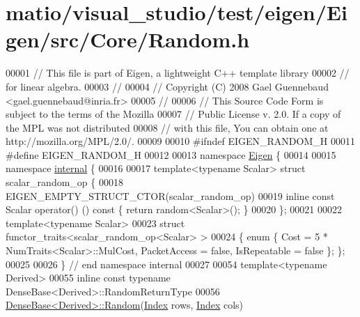 \hypertarget{matio_2visual__studio_2test_2eigen_2_eigen_2src_2_core_2_random_8h_source}{}\section{matio/visual\+\_\+studio/test/eigen/\+Eigen/src/\+Core/\+Random.h}
\label{matio_2visual__studio_2test_2eigen_2_eigen_2src_2_core_2_random_8h_source}

\begin{DoxyCode}
00001 \textcolor{comment}{// This file is part of Eigen, a lightweight C++ template library}
00002 \textcolor{comment}{// for linear algebra.}
00003 \textcolor{comment}{//}
00004 \textcolor{comment}{// Copyright (C) 2008 Gael Guennebaud <gael.guennebaud@inria.fr>}
00005 \textcolor{comment}{//}
00006 \textcolor{comment}{// This Source Code Form is subject to the terms of the Mozilla}
00007 \textcolor{comment}{// Public License v. 2.0. If a copy of the MPL was not distributed}
00008 \textcolor{comment}{// with this file, You can obtain one at http://mozilla.org/MPL/2.0/.}
00009 
00010 \textcolor{preprocessor}{#ifndef EIGEN\_RANDOM\_H}
00011 \textcolor{preprocessor}{#define EIGEN\_RANDOM\_H}
00012 
00013 \textcolor{keyword}{namespace }\hyperlink{namespace_eigen}{Eigen} \{ 
00014 
00015 \textcolor{keyword}{namespace }\hyperlink{namespaceinternal}{internal} \{
00016 
00017 \textcolor{keyword}{template}<\textcolor{keyword}{typename} Scalar> \textcolor{keyword}{struct }scalar\_random\_op \{
00018   EIGEN\_EMPTY\_STRUCT\_CTOR(scalar\_random\_op)
00019   \textcolor{keyword}{inline} \textcolor{keyword}{const} Scalar operator() ()\textcolor{keyword}{ const }\{ \textcolor{keywordflow}{return} random<Scalar>(); \}
00020 \};
00021 
00022 \textcolor{keyword}{template}<\textcolor{keyword}{typename} Scalar>
00023 \textcolor{keyword}{struct }functor\_traits<scalar\_random\_op<Scalar> >
00024 \{ \textcolor{keyword}{enum} \{ Cost = 5 * NumTraits<Scalar>::MulCost, PacketAccess = \textcolor{keyword}{false}, IsRepeatable = \textcolor{keyword}{false} \}; \};
00025 
00026 \} \textcolor{comment}{// end namespace internal}
00027 
00054 \textcolor{keyword}{template}<\textcolor{keyword}{typename} Derived>
00055 \textcolor{keyword}{inline} \textcolor{keyword}{const} \textcolor{keyword}{typename} DenseBase<Derived>::RandomReturnType
00056 \hyperlink{group___core___module_ae814abb451b48ed872819192dc188c19}{DenseBase<Derived>::Random}(\hyperlink{namespace_eigen_a62e77e0933482dafde8fe197d9a2cfde}{Index} rows, \hyperlink{namespace_eigen_a62e77e0933482dafde8fe197d9a2cfde}{Index} cols)

\end{DoxyCode}
